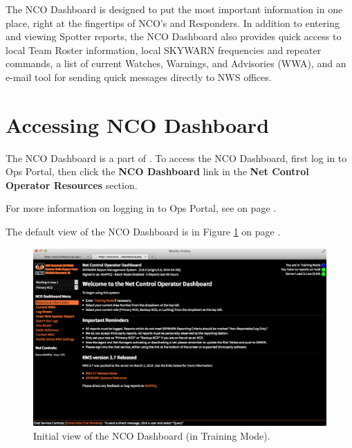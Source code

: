 \documentclass[pdflatex,letterpaper,twoside,12pt]{book}
\begin{document}
The NCO Dashboard is designed to put the most important information in one place, right at the fingertips of NCO's and Responders.  In addition to entering and viewing Spotter reports, the NCO Dashboard also provides quick access to local Team Roster information, local SKYWARN frequencies and repeater commands, a list of current Watches, Warnings, and Advisories (WWA), and an e-mail tool for sending quick messages directly to NWS offices.


\section{Accessing NCO Dashboard}

The NCO Dashboard is a part of .  To access the NCO Dashboard, first log in to Ops Portal, then click the \textbf{NCO Dashboard} link in the \textbf{Net Control Operator Resources} section.

For more information on logging in to Ops Portal, see  on page \pageref{accessing-ops-portal}.

The default view of the NCO Dashboard is in Figure \ref{fig:dash-main-screen} on page \pageref{fig:dash-main-screen}.

\begin{figure}[h]
  \centering
  \includegraphics[width=\textwidth,keepaspectratio=true]{img/dash-main-screen}
  \caption{Initial view of the NCO Dashboard (in Training Mode).\label{fig:dash-main-screen}}
\end{figure}

\end{document}
